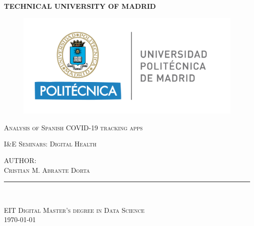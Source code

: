 \begin{titlepage}
\begin{center}
	\vspace{5 mm}
	    \textbf{\Large TECHNICAL UNIVERSITY OF MADRID}
	\par
	\vspace{10 mm}
	\begin{figure}[htb]
	    \centering
	    \includegraphics[scale=0.7]{images/uni-logo.png}
	\end{figure}



    \vspace{20 mm}\textsc{\Large Analysis of Spanish COVID-19 tracking apps}
    \par
    \vspace{10 mm}\textsc{I\&E Seminars: Digital Health}
    \par
    \vspace{10 mm}
    \textsc{
        AUTHOR: \\
        Cristian M. Abrante Dorta
    }
    \par
	\rule{80mm}{0.1mm}\\
	\vspace{10 mm}
	
    \textsc{EIT Digital Master's degree in Data Science}\\
    \textsc{\today}
\end{center}
\end{titlepage}

